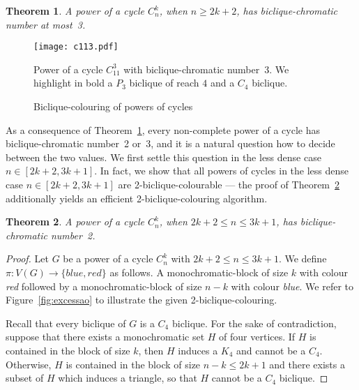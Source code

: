 \documentclass{article}
\newtheorem{theorem}{Theorem}
\begin{document}
\begin{theorem}
\label{thm:bicliqueupperboundpowerofcycle}
A power of a cycle $C_n^k$, when $n \geq 2k + 2$,
has biclique-chromatic number at most~3.
\end{theorem}


\begin{figure}[t]
\centering
	\texttt{[image: c113.pdf]}
	\caption{Power of a cycle $C_{11}^{3}$ with biclique-chromatic number~3.
	We highlight in bold a $P_{3}$ biclique of reach $4$ and a $C_4$ biclique.}
	\label{fig:c113}
\end{figure}

\begin{figure}[t]
\centering
	\qquad
	\qquad
	\qquad
	\caption{Biclique-colouring of
	powers of cycles}
	\label{fig:2nd3bicliquecolouring}
\end{figure}

As a consequence of Theorem~\ref{thm:bicliqueupperboundpowerofcycle}, every
non-complete power of a cycle has biclique-chromatic number~2 or~3, and it is a
natural question how to decide between the two values.
We first settle this question in the less dense case $n \in [2k + 2, 3k + 1]$.
In fact, we show that all powers of cycles in the less dense case $n \in [2k +
2, 3k + 1]$ are 2-biclique-colourable --- the proof of
Theorem~\ref{thm:kappabpowerofcyclesecondinterval} additionally yields an
efficient 2-biclique-colouring algorithm.

\begin{theorem}
\label{thm:kappabpowerofcyclesecondinterval}
 A power of a cycle $C_n^k$, when $2k + 2 \leq n \leq 3k + 1$, has
 biclique-chromatic number~2.
\end{theorem}

\begin{proof}
Let $G$ be a power of a cycle $C_{n}^{k}$ with $2k + 2 \leq n \leq 3k + 1$. We
define $\pi:V(G)\rightarrow\{blue,red\}$ as follows. A monochromatic-block of
size $k$ with colour \emph{red} followed by a monochromatic-block of size $n-k$
with colour \emph{blue}. We refer to Figure~\ref{fig:excessao} to illustrate the
given 2-biclique-colouring.

Recall that every biclique of $G$ is a $C_{4}$ biclique. For the sake of
contradiction, suppose that there exists a monochromatic set $H$ of four
vertices. If $H$ is contained in the block of size $k$, then $H$ induces a
$K_4$ and cannot be a $C_4$. Otherwise, $H$ is contained in the block of size
$n - k \leq 2k + 1$ and there exists a subset of $H$ which induces a triangle,
so that $H$ cannot be a $C_4$ biclique.
\end{proof}
\end{document}
